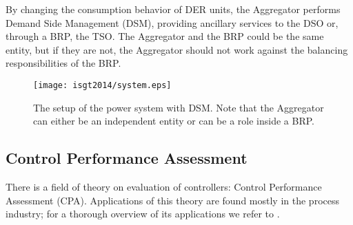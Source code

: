 	By changing the consumption behavior of DER units, the Aggregator performs Demand Side Management (DSM), providing ancillary services to the DSO or, through a BRP, the TSO. The Aggregator and the BRP could be the same entity, but if they are not, the Aggregator should not work against the balancing responsibilities of the BRP.  
	
	\begin{figure}[t]  %
		\centering
		\texttt{[image: isgt2014/system.eps]}
		\caption{The setup of the power system with DSM. Note that the Aggregator can either be an independent entity or can be a role inside a BRP.}\label{fig:systemarch}
	\end{figure}
	
	

	
	\subsection{Control Performance Assessment}
	There is a field of theory on evaluation of controllers: Control Performance Assessment (CPA). Applications of this theory are found mostly in the process industry; for a thorough overview of its applications we refer to \cite{jelali2006overview,Green}. 

